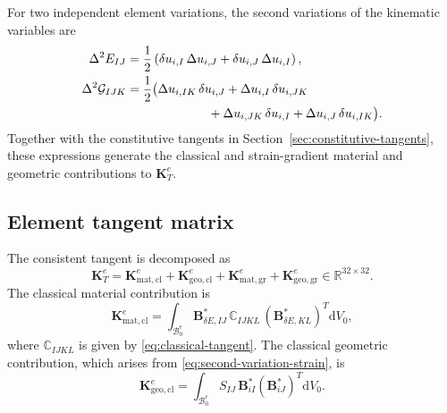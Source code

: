 \documentclass[preprint,12pt]{elsarticle}
\begin{document}
For two independent element variations, the second variations of the
kinematic variables are
\begin{align}
 \Delta^2E_{IJ}
 &=\frac{1}{2}\left(
 \delta u_{i,I}\,\Delta u_{i,J}
 +\delta u_{i,J}\,\Delta u_{i,I}
 \right),
 \label{eq:second-variation-strain}\\
 \Delta^2\mathcal{G}_{IJK}
 &=\frac{1}{2}\bigl(
 \Delta u_{i,IK}\,\delta u_{i,J}
 +\Delta u_{i,I}\,\delta u_{i,JK}
 \nonumber\\
 &\hspace{23mm}
 +\Delta u_{i,JK}\,\delta u_{i,I}
 +\Delta u_{i,J}\,\delta u_{i,IK}
 \bigr).
 \label{eq:second-variation-strain-gradient}
\end{align}
Together with the constitutive tangents in
Section~\ref{sec:constitutive-tangents}, these expressions generate the
classical and strain-gradient material and geometric contributions to
$\mathbf{K}_T^e$.

\subsection{Element tangent matrix}
\label{sec:element-tangent-matrix}

The consistent tangent is decomposed as
\begin{equation}
 \mathbf{K}_T^e
 =\mathbf{K}_{\mathrm{mat,cl}}^e
 +\mathbf{K}_{\mathrm{geo,cl}}^e
 +\mathbf{K}_{\mathrm{mat,gr}}^e
 +\mathbf{K}_{\mathrm{geo,gr}}^e
 \in\mathbb{R}^{32\times32}.
 \label{eq:element-tangent-decomposition}
\end{equation}
The classical material contribution is
\begin{equation}
 \mathbf{K}_{\mathrm{mat,cl}}^e
 =\int_{\mathcal{B}_0^e}
 \mathbf{B}_{\delta E,IJ}^{*}\,
 \mathbb{C}_{IJKL}\,
 \left(\mathbf{B}_{\delta E,KL}^{*}\right)^T
 \mathrm{d}V_0,
 \label{eq:classical-material-tangent}
\end{equation}
where $\mathbb{C}_{IJKL}$ is given by
\eqref{eq:classical-tangent}. The classical geometric contribution,
which arises from \eqref{eq:second-variation-strain}, is
\begin{equation}
 \mathbf{K}_{\mathrm{geo,cl}}^e
 =\int_{\mathcal{B}_0^e}
 S_{IJ}\,\mathbf{B}_{iI}^{*}
 \left(\mathbf{B}_{iJ}^{*}\right)^T
 \mathrm{d}V_0.
 \label{eq:classical-geometric-tangent}
\end{equation}
\end{document}
